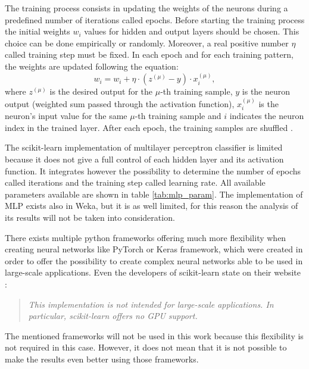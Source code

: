 The training process consists in updating the weights of the neurons during a predefined number of iterations called epochs. Before starting the training process the initial weights $w_i$ values for hidden and output layers should be chosen. This choice can be done empirically or randomly. Moreover, a real positive number $\eta$ called training step must be fixed. In each epoch and for each training pattern, the weights are updated following the equation:
\begin{equation}
    w_i = w_i + \eta\cdot (z^{(\mu)}-y) \cdot x_i^{(\mu)},
\end{equation}
where $z^{(\mu)}$ is the desired output for the $\mu$-th training sample, $y$ is the neuron output (weighted sum passed through the activation function), $x_i^{(\mu)}$ is the neuron's input value for the same $\mu$-th training sample and $i$ indicates the neuron index in the trained layer. After each epoch, the training samples are shuffled \cite{stokfiszewski_soft_nodate}. 

The scikit-learn implementation of multilayer perceptron classifier is limited because it does not give a full control of each hidden layer and its activation function. It integrates however the possibility to determine the number of epochs called iterations and the training step called learning rate. All available parameters available are shown in table \ref{tab:mlp_param}. The implementation of MLP exists also in Weka, but it is as well limited, for this reason the analysis of its results will not be taken into consideration.

There exists multiple python frameworks offering much more flexibility when creating neural networks like PyTorch or Keras framework, which were created in order to offer the possibility to create complex neural networks able to be used in large-scale applications. Even the developers of scikit-learn state on their website \cite{noauthor_neural_nodate}:

\begin{quote}
    \textit{This implementation is not intended for large-scale applications. In particular, \mbox{scikit-learn} offers no GPU support.} 
\end{quote}

The mentioned frameworks will not be used in this work because this flexibility is not required in this case. However, it does not mean that it is not possible to make the results even better using those frameworks.

